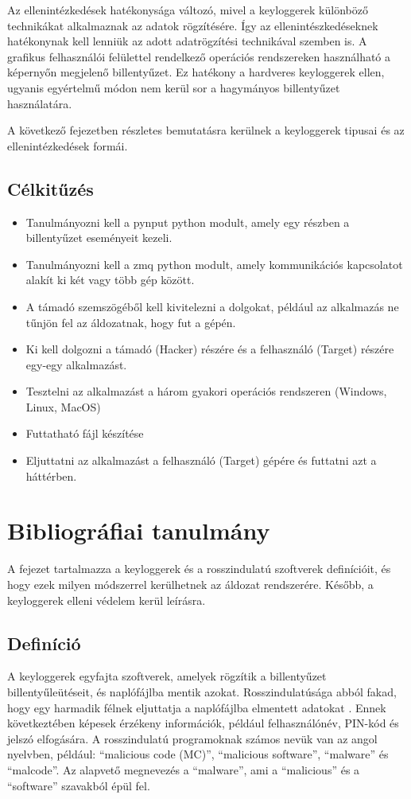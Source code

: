 \documentclass[12pt,a4paper,oneside]{report}
\begin{document}
Az ellenintézkedések hatékonysága változó, mivel a keyloggerek különböző technikákat alkalmaznak az adatok rögzítésére. Így az ellenintészkedéseknek hatékonynak kell lenniük az adott adatrögzítési technikával szemben is. A grafikus felhasználói felülettel rendelkező operációs rendszereken használható a képernyőn megjelenő billentyűzet. Ez hatékony a hardveres keyloggerek ellen, ugyanis egyértelmű módon nem kerül sor a hagymányos billentyűzet használatára.

A következő fejezetben részletes bemutatásra kerülnek a keyloggerek tipusai és az ellenintézkedések formái.

\section{Célkitűzés}
\begin{itemize}
\item Tanulmányozni kell a pynput python modult, amely egy részben a billentyűzet eseményeit kezeli.
\item Tanulmányozni kell a zmq python modult, amely kommunikációs kapcsolatot alakít ki két vagy több gép között.
\item A támadó szemszögéből kell kivitelezni a dolgokat, például az alkalmazás ne tűnjön fel az áldozatnak, hogy fut a gépén.
\item Ki kell dolgozni a támadó (Hacker) részére és a felhasználó (Target) részére egy-egy alkalmazást.
\item Tesztelni az alkalmazást a három gyakori operációs rendszeren (Windows, Linux, MacOS)
\item Futtatható fájl készítése
\item Eljuttatni az alkalmazást a felhasználó (Target) gépére és futtatni azt a háttérben.
\end{itemize}


\chapter{Bibliográfiai tanulmány}\label{sec:bibl}
A fejezet tartalmazza a keyloggerek és a rosszindulatú szoftverek definícióit, és hogy ezek milyen módszerrel kerülhetnek az áldozat rendszerére. Később, a keyloggerek elleni védelem kerül leírásra.

\section{Definíció}
A keyloggerek egyfajta szoftverek, amelyek rögzítik a billentyűzet billentyűleütéseit, és naplófájlba mentik azokat. Rosszindulatúsága abból fakad, hogy egy harmadik félnek eljuttatja a naplófájlba elmentett adatokat \parencite{ahmed2014survey}. Ennek következtében képesek érzékeny információk, például felhasználónév, PIN-kód és jelszó elfogására.  A rosszindulatú programoknak számos nevük van az angol nyelvben, például: ``malicious code (MC)'', ``malicious software'', ``malware'' és ``malcode''. Az alapvető megnevezés a ``malware'', ami a ``malicious'' és a ``software'' szavakból épül fel. 
\end{document}
